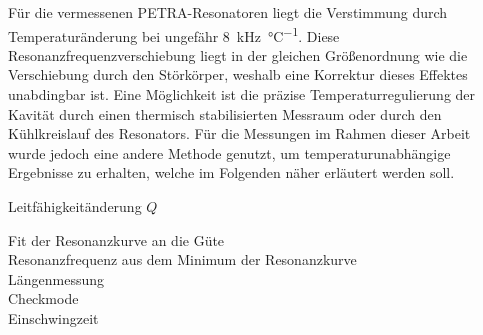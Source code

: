 Für die vermessenen PETRA-Resonatoren liegt die Verstimmung durch Temperaturänderung bei ungefähr \SI{8}{\kilo\hertz\per\celsius}.
Diese Resonanzfrequenzverschiebung liegt in der gleichen Größenordnung wie die Verschiebung durch den Störkörper, weshalb eine Korrektur dieses Effektes unabdingbar ist.
Eine Möglichkeit ist die präzise Temperaturregulierung der Kavität durch einen thermisch stabilisierten Messraum oder durch den Kühlkreislauf des Resonators.
Für die Messungen im Rahmen dieser Arbeit wurde jedoch eine andere Methode genutzt, um temperaturunabhängige Ergebnisse zu erhalten, welche im Folgenden näher erläutert werden soll.






Leitfähigkeitänderung $Q$

Fit der Resonanzkurve an die Güte\\
Resonanzfrequenz aus dem Minimum der Resonanzkurve\\
Längenmessung\\
Checkmode\\
Einschwingzeit
